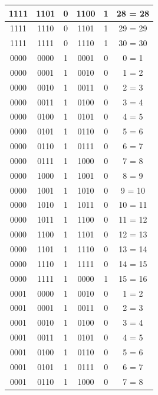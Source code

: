 \documentclass{exam}
\begin{document}
\begin{center}
\begin{longtable}{|c|c|c|c|c|c|}
                1111 & 1101 & 0 & 1100 & 1 & 28 = 28 \\ \hline
                1111 & 1110 & 0 & 1101 & 1 & 29 = 29 \\ \hline
                1111 & 1111 & 0 & 1110 & 1 & 30 = 30 \\ \hline
                0000 & 0000 & 1 & 0001 & 0 & 0 = 1 \\ \hline
                0000 & 0001 & 1 & 0010 & 0 & 1 = 2 \\ \hline
                0000 & 0010 & 1 & 0011 & 0 & 2 = 3 \\ \hline
                0000 & 0011 & 1 & 0100 & 0 & 3 = 4 \\ \hline
                0000 & 0100 & 1 & 0101 & 0 & 4 = 5 \\ \hline
                0000 & 0101 & 1 & 0110 & 0 & 5 = 6 \\ \hline
                0000 & 0110 & 1 & 0111 & 0 & 6 = 7 \\ \hline
                0000 & 0111 & 1 & 1000 & 0 & 7 = 8 \\ \hline
                0000 & 1000 & 1 & 1001 & 0 & 8 = 9 \\ \hline
                0000 & 1001 & 1 & 1010 & 0 & 9 = 10 \\ \hline
                0000 & 1010 & 1 & 1011 & 0 & 10 = 11 \\ \hline
                0000 & 1011 & 1 & 1100 & 0 & 11 = 12 \\ \hline
                0000 & 1100 & 1 & 1101 & 0 & 12 = 13 \\ \hline
                0000 & 1101 & 1 & 1110 & 0 & 13 = 14 \\ \hline
                0000 & 1110 & 1 & 1111 & 0 & 14 = 15 \\ \hline
                0000 & 1111 & 1 & 0000 & 1 & 15 = 16 \\ \hline
                0001 & 0000 & 1 & 0010 & 0 & 1 = 2 \\ \hline
                0001 & 0001 & 1 & 0011 & 0 & 2 = 3 \\ \hline
                0001 & 0010 & 1 & 0100 & 0 & 3 = 4 \\ \hline
                0001 & 0011 & 1 & 0101 & 0 & 4 = 5 \\ \hline
                0001 & 0100 & 1 & 0110 & 0 & 5 = 6 \\ \hline
                0001 & 0101 & 1 & 0111 & 0 & 6 = 7 \\ \hline
                0001 & 0110 & 1 & 1000 & 0 & 7 = 8 \\ \hline

\end{longtable}
\end{center}
\end{document}

